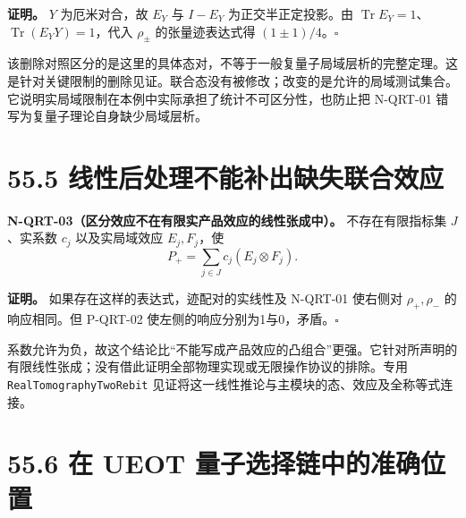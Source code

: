 \documentclass[
  11pt,
  oneside]{book}
\begin{document}
\textbf{证明。} \(Y\) 为厄米对合，故 \(E_Y\) 与 \(I-E_Y\)
为正交半正定投影。由
\(\operatorname{Tr}E_Y=1\)、\(\operatorname{Tr}(E_YY)=1\)，代入
\(\rho_\pm\) 的张量迹表达式得 \((1\pm1)/4\)。\(\square\)

该删除对照区分的是这里的具体态对，不等于一般复量子局域层析的完整定理。这是针对关键限制的删除见证。联合态没有被修改；改变的是允许的局域测试集合。它说明实局域限制在本例中实际承担了统计不可区分性，也防止把
N-QRT-01 错写为复量子理论自身缺少局域层析。

\hypertarget{ux7ebfux6027ux540eux5904ux7406ux4e0dux80fdux8865ux51faux7f3aux5931ux8054ux5408ux6548ux5e94}{%
\section{55.5
线性后处理不能补出缺失联合效应}\label{ux7ebfux6027ux540eux5904ux7406ux4e0dux80fdux8865ux51faux7f3aux5931ux8054ux5408ux6548ux5e94}}

\protect\hypertarget{n-qrt-03}{}{}

\textbf{N-QRT-03（区分效应不在有限实产品效应的线性张成中）。}
不存在有限指标集 \(J\)、实系数 \(c_j\) 以及实局域效应 \(E_j,F_j\)，使 \[
P_+=\sum_{j\in J}c_j(E_j\otimes F_j).
\]

\textbf{证明。} 如果存在这样的表达式，迹配对的实线性及 N-QRT-01 使右侧对
\(\rho_+,\rho_-\) 的响应相同。但 P-QRT-02
使左侧的响应分别为1与0，矛盾。\(\square\)

系数允许为负，故这个结论比``不能写成产品效应的凸组合''更强。它针对所声明的有限线性张成；没有借此证明全部物理实现或无限操作协议的排除。专用
\texttt{RealTomographyTwoRebit}
见证将这一线性推论与主模块的态、效应及全称等式连接。

\hypertarget{ux5728-ueot-ux91cfux5b50ux9009ux62e9ux94feux4e2dux7684ux51c6ux786eux4f4dux7f6e}{%
\section{55.6 在 UEOT
量子选择链中的准确位置}\label{ux5728-ueot-ux91cfux5b50ux9009ux62e9ux94feux4e2dux7684ux51c6ux786eux4f4dux7f6e}}
\end{document}
